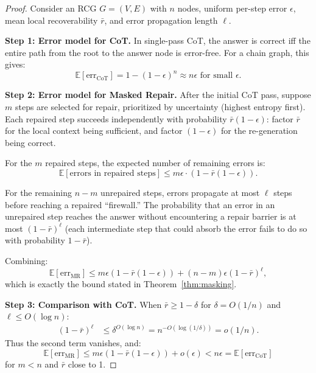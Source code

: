 \documentclass{article}
\begin{document}
\begin{proof}
Consider an RCG $G = (V, E)$ with $n$ nodes, uniform per-step error $\epsilon$, mean local recoverability $\bar{r}$, and error propagation length $\ell$.

\textbf{Step 1: Error model for CoT.} In single-pass CoT, the answer is correct iff the entire path from the root to the answer node is error-free. For a chain graph, this gives:
\begin{equation}
\mathbb{E}[\text{err}_{\text{CoT}}] = 1 - (1-\epsilon)^n \approx n\epsilon \text{ for small } \epsilon.
\end{equation}

\textbf{Step 2: Error model for Masked Repair.} After the initial CoT pass, suppose $m$ steps are selected for repair, prioritized by uncertainty (highest entropy first). Each repaired step succeeds independently with probability $\bar{r}(1-\epsilon)$: factor $\bar{r}$ for the local context being sufficient, and factor $(1-\epsilon)$ for the re-generation being correct.

For the $m$ repaired steps, the expected number of remaining errors is:
\begin{equation}
\mathbb{E}[\text{errors in repaired steps}] \leq m\epsilon \cdot (1 - \bar{r}(1-\epsilon)).
\end{equation}

For the remaining $n-m$ unrepaired steps, errors propagate at most $\ell$ steps before reaching a repaired ``firewall.'' The probability that an error in an unrepaired step reaches the answer without encountering a repair barrier is at most $(1-\bar{r})^\ell$ (each intermediate step that could absorb the error fails to do so with probability $1-\bar{r}$).

Combining:
\begin{equation}
\mathbb{E}[\text{err}_{\text{MR}}] \leq m\epsilon(1 - \bar{r}(1-\epsilon)) + (n-m)\epsilon(1-\bar{r})^\ell,
\end{equation}
which is exactly the bound stated in Theorem~\ref{thm:masking}.

\textbf{Step 3: Comparison with CoT.} When $\bar{r} \geq 1 - \delta$ for $\delta = O(1/n)$ and $\ell \leq O(\log n)$:
\begin{align}
(1-\bar{r})^\ell &\leq \delta^{O(\log n)} = n^{-O(\log(1/\delta))} = o(1/n).
\end{align}
Thus the second term vanishes, and:
\begin{equation}
\mathbb{E}[\text{err}_{\text{MR}}] \leq m\epsilon(1 - \bar{r}(1-\epsilon)) + o(\epsilon) < n\epsilon = \mathbb{E}[\text{err}_{\text{CoT}}]
\end{equation}
for $m < n$ and $\bar{r}$ close to 1.


\end{proof}
\end{document}
